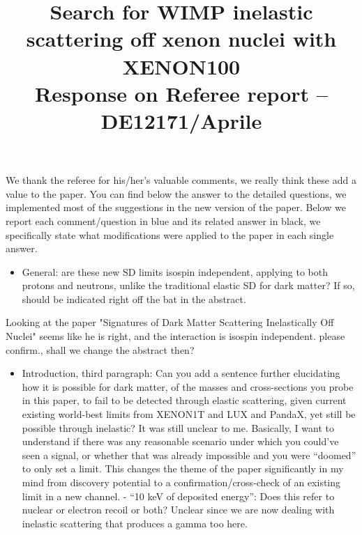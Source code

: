 \documentclass{article}
\begin{document}
\title{ \textbf{ Search for WIMP inelastic scattering off xenon nuclei with XENON100} \\  Response on Referee report -- DE12171/Aprile  }

\maketitle



We thank the referee for his/her's valuable comments, we really think these add a value to the paper. 
You can find below the answer to the detailed questions, we implemented most of the suggestions in the new version of the paper.
Below we report each  comment/question in blue and its related answer in black, we specifically state what modifications
were applied to the paper in each single answer.


\begin{itemize}
	\item {\color{blue} General: are these new SD limits isospin independent, applying to both protons and neutrons, unlike the traditional elastic SD for dark matter? If so, should be indicated right off the bat in the abstract.}
\end{itemize}

Looking at the paper "Signatures of Dark Matter Scattering Inelastically Off Nuclei" seems like he is right,
and the interaction is isospin independent. {\color{red} please confirm.}, shall we change the abstract then?

\begin{itemize}
	\item {\color{blue} Introduction, third paragraph: Can you add a sentence further
elucidating how it is possible for dark matter, of the masses and
cross-sections you probe in this paper, to fail to be detected through
elastic scattering, given current existing world-best limits from
XENON1T and LUX and PandaX, yet still be possible through inelastic?
It was still unclear to me. Basically, I want to understand if there
was any reasonable scenario under which you could’ve seen a signal, or
whether that was already impossible and you were “doomed” to only set
a limit. This changes the theme of the paper significantly in my mind
from discovery potential to a confirmation/cross-check of an existing
limit in a new channel. - “10 keV of deposited energy”: Does this
refer to nuclear or electron recoil or both? Unclear since we are now
dealing with inelastic scattering that produces a gamma too here.}
\end{itemize}
\end{document}
